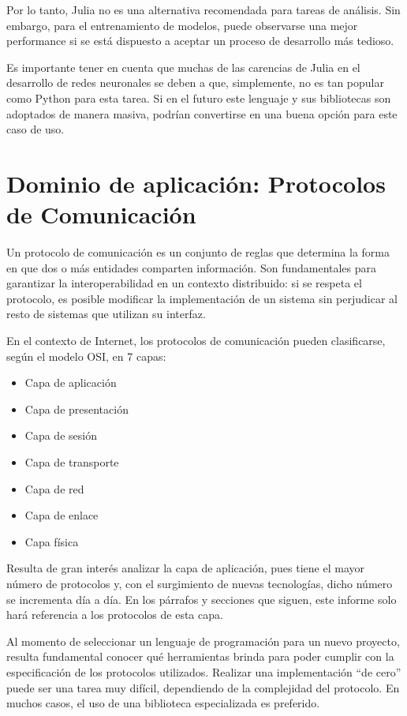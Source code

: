 \documentclass[11pt]{article}
\let\Oldsection\section
\renewcommand{\section}{\FloatBarrier\Oldsection}
\begin{document}
Por lo tanto, Julia no es una alternativa recomendada para tareas de análisis. Sin embargo, para el entrenamiento de modelos, puede observarse una mejor performance si se está dispuesto a aceptar un proceso de desarrollo más tedioso.

Es importante tener en cuenta que muchas de las carencias de Julia en el desarrollo de redes neuronales se deben a que, simplemente, no es tan popular como Python para esta tarea. Si en el futuro este lenguaje y sus bibliotecas son adoptados de manera masiva, podrían convertirse en una buena opción para este caso de uso.

\newpage

\section{Dominio de aplicación: Protocolos de Comunicación}

Un protocolo de comunicación es un conjunto de reglas que determina la forma en que dos o más entidades comparten información. Son fundamentales para garantizar la interoperabilidad en un contexto distribuido: si se respeta el protocolo, es posible modificar la implementación de un sistema sin perjudicar al resto de sistemas que utilizan su interfaz.

En el contexto de Internet, los protocolos de comunicación pueden clasificarse, según el modelo OSI, en 7 capas:

\begin{itemize} %
    \item Capa de aplicación
    \item Capa de presentación
    \item Capa de sesión
    \item Capa de transporte
    \item Capa de red
    \item Capa de enlace
    \item Capa física
\end{itemize}

Resulta de gran interés analizar la capa de aplicación, pues tiene el mayor número de protocolos y, con el surgimiento de nuevas tecnologías, dicho número se incrementa día a día. En los párrafos y secciones que siguen, este informe solo hará referencia a los protocolos de esta capa. %

Al momento de seleccionar un lenguaje de programación para un nuevo proyecto, resulta fundamental conocer qué herramientas brinda para poder cumplir con la especificación de los protocolos utilizados. Realizar una implementación ``de cero'' puede ser una tarea muy difícil, dependiendo de la complejidad del protocolo. En muchos casos, el uso de una biblioteca especializada es preferido.
\end{document}
